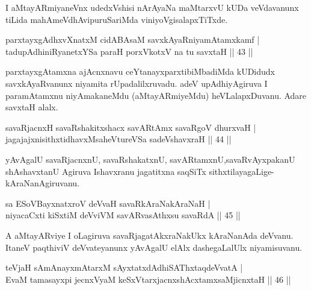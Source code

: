 \begin{artha}
I aMtayARmiyaneVnx udedxVshisi nArAyaNa maMtarxvU kUDa veVdavanunx tiLida mahAmeVdhAvipuruSariMda viniyoVgisalapxTiTxde.
\end{artha}

\begin{shl}
parxtayxgAdhxvXnatxM cidABAsaM savxkAyaRniyamAtamxkamf |\\
tadupAdhiniRyanetxYSa paraH porxVkotxV na tu savxtaH \hfill || 43 ||
\end{shl}

\begin{artha}%
parxtayxgAtamxna ajAcnxnavu ceYtanayxparxtibiMbadiMda kUDidudx savxkAyaRvanunx niyamita rUpadalilxruvadu. adeV upAdhiyAgiruva I paramAtamxnu niyAmakaneMdu (aMtayARmiyeMdu) heVLalapxDuvanu. Adare savxtaH alalx.
\end{artha}

\begin{shl}
savaRjacnxH savaRshakitxshacx savARtAmx savaRgoV dhurxvaH |\\
jagajajxnisithxtidhavxMsaheVtureVSa sadeVshavxraH \hfill || 44 ||
\end{shl}

\begin{artha}
yAvAgalU savaRjacnxnU, savaRshakatxnU, savARtamxnU,\break savaRvAyxpakanU shAshavxtanU Agiruva Ishavxranu jagatitxna saqSiTx sithxtilayagaLige-kAraNanAgiruvanu.
\end{artha}


\begin{shl}
sa ESoV\s BayxnatxroV deVvaH savaRkAraNakAraNaH |\\
niyacaCxti kiSxtiM deVviVM savARvasAthxsu savaRdA \hfill || 45 ||
\end{shl}

\begin{artha}
A aMtayARviye I oLagiruva savaRjagatAkxraNakUkx kAraNanAda deVvanu. ItaneV paqthiviV deVvateyanunx yAvAgalU elAlx dashegaLalUlx niyamisuvanu.
\end{artha}


\begin{shl}
teVjaH sAmAnayxmAtarxM sAyxtatxdAdhiSAThxtaqdeVvatA |\\
EvaM tamasayxpi jecnxVyaM keSxVtarxjacnxshAcx\s \s tamxsaMjicnxtaH \hfill || 46 ||
\end{shl}

